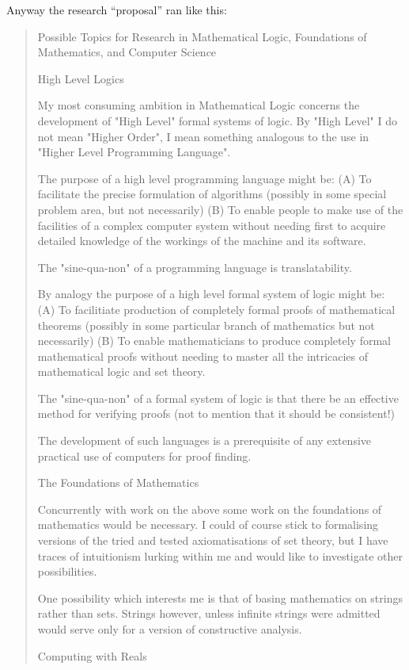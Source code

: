 \documentclass[10pt,titlepage]{book}
\begin{document}
Anyway the research ``proposal'' ran like this:

\begin{quote}
Possible Topics for Research in Mathematical Logic, Foundations of Mathematics, and Computer Science

High Level Logics

My most consuming ambition in Mathematical Logic concerns the development of "High Level" formal systems of logic. By "High Level" I do not mean "Higher Order", I mean something analogous to the use in "Higher Level Programming Language".

The purpose of a high level programming language might be:
(A)	To facilitate the precise formulation of algorithms (possibly in some special problem area, but not necessarily)
(B)	To enable people to make use of the facilities of a complex computer system without needing first to acquire detailed knowledge of the workings of the machine and its software.

The "sine-qua-non" of a programming language is translatability.

By analogy the purpose of a high level formal system of logic might be:
(A)	To facilitiate production of completely formal proofs of mathematical theorems (possibly in some particular branch of mathematics but not necessarily)
(B)	To enable mathematicians to produce completely formal mathematical proofs without needing to master all the intricacies of mathematical logic and set theory.

The "sine-qua-non" of a formal system of logic is that there be an effective method for verifying proofs (not to mention that it should be consistent!)

The development of such languages is a prerequisite of any extensive practical use of computers for proof finding.

The Foundations of Mathematics

Concurrently with work on the above some work on the foundations of mathematics would be necessary. I could of course stick to formalising versions of the tried and tested axiomatisations of set theory, but I have traces of intuitionism lurking within me and would like to investigate other possibilities.

One possibility which interests me is that of basing mathematics on strings rather than sets. Strings however, unless infinite strings were admitted would serve only for a version of constructive analysis.

Computing with Reals


\end{quote}
\end{document}
